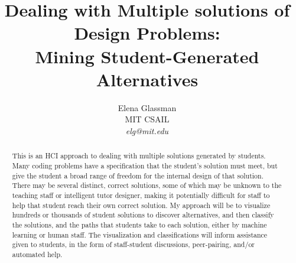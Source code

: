 \documentclass[12pt]{article}
\begin{document}
\title{Dealing with Multiple solutions of Design Problems: \\Mining Student-Generated Alternatives}

\author{Elena Glassman \\ MIT CSAIL \\ \textit{elg@mit.edu}
}

\maketitle

\begin{abstract}
This is an HCI approach to dealing with multiple solutions generated by students. Many coding problems have a specification that the student's solution must meet, but give the student a broad range of freedom for the internal design of that solution. There may be several distinct, correct solutions, some of which may be unknown to the teaching staff or intelligent tutor designer, making it potentially difficult for staff to help that student reach their own correct solution. My approach will be to visualize hundreds or thousands of student solutions to discover alternatives, and then classify the solutions, and the paths that students take to each solution, either by machine learning or human staff. The visualization and classifications will inform assistance given to students, in the form of staff-student discussions, peer-pairing, and/or automated help.

\end{abstract}
\end{document}
